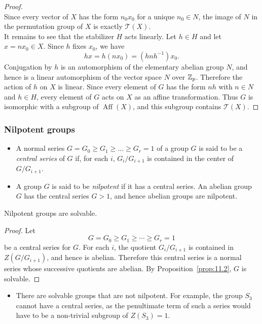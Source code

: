 \documentclass[../Odyssey_Project.tex]{subfiles}
\begin{document}
\begin{proof}
\[    \]
    Since every vector of $X$ has the form $n_0x_0$ for a unique $n_0\in N$, the image of $N$ in the permutation group of $X$ is exactly $\mathcal{T}(X)$.\\
    It remains to see that the stabilizer $H$ acts linearly. Let $h\in H$ and let $x=nx_0\in X$. Since $h$ fixes $x_0$, we have
    \[
        h x=h(nx_0)=(hnh^{-1})x_0.
    \]
    Conjugation by $h$ is an automorphism of the elementary abelian group $N$, and hence is a linear automorphism of the vector space $N$ over $\mathbb{Z}_p$. Therefore the action of $h$ on $X$ is linear. Since every element of $G$ has the form $nh$ with $n\in N$ and $h\in H$, every element of $G$ acts on $X$ as an affine transformation. Thus $G$ is isomorphic with a subgroup of $\operatorname{Aff}(X)$, and this subgroup contains $\mathcal{T}(X)$.
\end{proof}

\subsubsection*{Nilpotent groups}
\begin{itemize}
    \item A normal series $G = G_0 \geq G_1 \geq \ldots \geq G_r = 1$ of a group $G$ is said to be a \emph{central series} of $G$ if, for each $i$, $G_i/G_{i+1}$ is contained in the center of $G/G_{i+1}$.
    \item A group $G$ is said to be \emph{nilpotent} if it has a central series. An abelian group $G$ has the central series $G > 1$, and hence abelian groups are nilpotent.
\end{itemize}

\begin{proposition}
\label{prop:11.13}
Nilpotent groups are solvable.
\end{proposition}
\begin{proof}
    Let
    \[
        G=G_0\geq G_1\geq \cdots \geq G_r=1
    \]
    be a central series for $G$. For each $i$, the quotient $G_i/G_{i+1}$ is contained in $Z(G/G_{i+1})$, and hence is abelian. Therefore this central series is a normal series whose successive quotients are abelian. By Proposition~\ref{prop:11.2}, $G$ is solvable.
\end{proof}

\begin{itemize}
    \item There are solvable groups that are not nilpotent. For example, the group $S_3$ cannot have a central series, as the penultimate term of such a series would have to be a non-trivial subgroup of $Z(S_3) = 1$.
\end{itemize}
\end{document}
